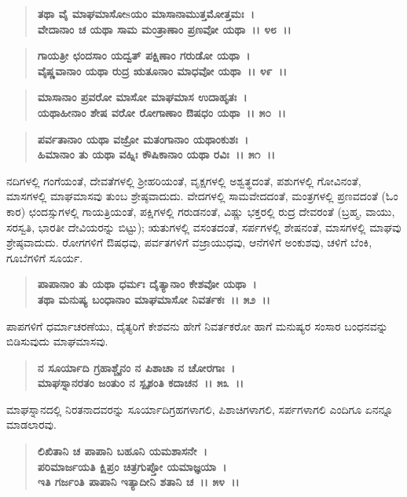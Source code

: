 \begin{verse}
\textbf{ತಥಾ ವೈ ಮಾಘಮಾಸೋsಯಂ ಮಾಸಾನಾಮುತ್ತಮೋತ್ತಮಃ~।}\\\textbf{ವೇದಾನಾಂ ಚ ಯಥಾ ಸಾಮ ಮಂತ್ರಾಣಾಂ ಪ್ರಣವೋ ಯಥಾ~।। ೪೮~।। }
\end{verse}

\begin{verse}
\textbf{ಗಾಯತ್ರೀ ಛಂದಸಾಂ ಯದ್ವತ್ ಪಕ್ಷಿಣಾಂ ಗರುಡೋ ಯಥಾ~।}\\\textbf{ವೈಷ್ಣವಾನಾಂ ಯಥಾ ರುದ್ರ ಋತೂನಾಂ ಮಾಧವೋ ಯಥಾ~।। ೪೯~।।}
\end{verse}

\begin{verse}
\textbf{ಮಾಸಾನಾಂ ಪ್ರವರೋ ಮಾಸೋ ಮಾಘಮಾಸ ಉದಾಹೃತಃ~।}\\\textbf{ಯಥಾಹೀನಾಂ ಶೇಷ ವರೋ ರೋಗಾಣಾಂ ಔಷಧಂ ಯಥಾ~।। ೫೦~।।}
\end{verse}

\begin{verse}
\textbf{ಪರ್ವತಾನಾಂ ಯಥಾ ವಜ್ರೋ ಮತಂಗಾನಾಂ ಯಥಾಂಕುಶಃ~।}\\\textbf{ಹಿಮಾನಾಂ ತು ಯಥಾ ವಹ್ನಿಃ ಕೌಷಿಕಾನಾಂ ಯಥಾ ರವಿಃ~।। ೫೧~।।}
\end{verse}

ನದಿಗಳಲ್ಲಿ ಗಂಗೆಯಂತೆ, ದೇವತೆಗಳಲ್ಲಿ ಶ‍್ರೀಹರಿಯಂತೆ, ವೃಕ್ಷಗಳಲ್ಲಿ ಅಶ್ವತ್ಥದಂತೆ, ಪಶುಗಳಲ್ಲಿ ಗೋವಿನಂತೆ, ಮಾಸಗಳಲ್ಲಿ ಮಾಘಮಾಸವು ತುಂಬ ಶ್ರೇಷ್ಠವಾದುದು. ವೇದಗಳಲ್ಲಿ ಸಾಮವೇದದಂತೆ, ಮಂತ್ರಗಳಲ್ಲಿ ಪ್ರಣವದಂತೆ (ಓಂ ಕಾರ) ಛಂದಸ್ಸುಗಳಲ್ಲಿ ಗಾಯತ್ರಿಯಂತೆ, ಪಕ್ಷಿಗಳಲ್ಲಿ ಗರುಡನಂತೆ, ವಿಷ್ಣು ಭಕ್ತರಲ್ಲಿ ರುದ್ರ ದೇವರಂತೆ (ಬ್ರಹ್ಮ, ವಾಯು, ಸರಸ್ವತಿ, ಭಾರತೀ ದೇವಿಯರನ್ನು ಬಿಟ್ಟು); ಋತುಗಳಲ್ಲಿ ವಸಂತದಂತೆ, ಸರ್ಪಗಳಲ್ಲಿ ಶೇಷನಂತೆ, ಮಾಸಗಳಲ್ಲಿ ಮಾಘವು ಶ್ರೇಷ್ಠವಾದುದು. ರೋಗಗಳಿಗೆ ಔಷಧವು, ಪರ್ವತಗಳಿಗೆ ವಜ್ರಾಯುಧವು, ಆನೆಗಳಿಗೆ ಅಂಕುಶವು, ಚಳಿಗೆ ಬೆಂಕಿ, ಗೂಬೆಗಳಿಗೆ ಸೂರ್ಯ.

\begin{verse}
\textbf{ಪಾಪಾನಾಂ ತು ಯಥಾ ಧರ್ಮಃ ದೈತ್ಯಾನಾಂ ಕೇಶವೋ ಯಥಾ~।}\\\textbf{ತಥಾ ಮನುಷ್ಯ ಬಂಧಾನಾಂ ಮಾಘಮಾಸೋ ನಿವರ್ತಕಃ~।। ೫೨~।।}
\end{verse}

ಪಾಪಗಳಿಗೆ ಧರ್ಮಾಚರಣೆಯು, ದೈತ್ಯರಿಗೆ ಕೇಶವನು ಹೇಗೆ ನಿವರ್ತಕರೋ ಹಾಗೆ ಮನುಷ್ಯರ ಸಂಸಾರ ಬಂಧನವನ್ನು ಬಿಡಿಸುವುದು ಮಾಘಮಾಸವು.

\begin{verse}
\textbf{ನ ಸೂರ್ಯಾದಿ ಗ್ರಹಾಶ್ಚೈನಂ ನ ಪಿಶಾಚಾ ನ ಚೋರಗಾಃ~।}\\\textbf{ಮಾಘಸ್ನಾನರತಂ ಜಂತುಂ ನ ಸ್ಪೃಶಂತಿ ಕದಾಚನ~।। ೫೩~।।}
\end{verse}

ಮಾಘಸ್ನಾನದಲ್ಲಿ ನಿರತನಾದವರನ್ನು ಸೂರ್ಯಾದಿಗ್ರಹಗಳಾಗಲಿ, ಪಿಶಾಚಿಗಳಾಗಲಿ, ಸರ್ಪಗಳಾಗಲಿ ಎಂದಿಗೂ ಏನನ್ನೂ ಮಾಡಲಾರವು.

\begin{verse}
\textbf{ಲಿಖಿತಾನಿ ಚ ಪಾಪಾನಿ ಬಹೂನಿ ಯಮಶಾಸನೇ~।}\\\textbf{ಪರಿಮಾರ್ಜಯತಿ ಕ್ಷಿಪ್ರಂ ಚಿತ್ರಗುಪ್ತೋ ಯಮಾಜ್ಞಯಾ~।}\\\textbf{ಇತಿ ಗರ್ಜಂತಿ ಪಾಪಾನಿ ಇತ್ಯಾದೀನಿ ಶತಾನಿ ಚ~।। ೫೪~।।}
\end{verse}

